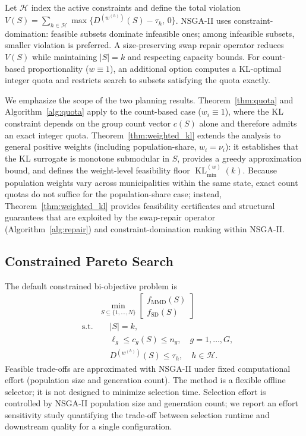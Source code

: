 \documentclass[10pt,journal]{IEEEtran}
\newcommand{\1}{\mathbf{1}}
\DeclareMathOperator{\KL}{KL}
\theoremstyle{ieeethm}
\begin{document}
Let $\mathcal{H}$ index the active constraints and define the total violation
$V(S)=\sum_{h\in\mathcal{H}} \max\{ D^{(w^{(h)})}(S) - \tau_h,\, 0\}$.
NSGA-II uses constraint-domination: feasible subsets dominate infeasible ones; among infeasible subsets, smaller violation is preferred.
A size-preserving swap repair operator reduces $V(S)$ while maintaining $|S|=k$ and respecting capacity bounds.
For count-based proportionality ($w\equiv 1$), an additional option computes a KL-optimal integer quota and restricts search to subsets satisfying the quota exactly.

We emphasize the scope of the two planning results. Theorem~\ref{thm:quota} and
Algorithm~\ref{alg:quota} apply to the count-based case ($w_i\equiv 1$), where the
KL constraint depends on the group count vector $c(S)$ alone and therefore admits an exact
integer quota. Theorem~\ref{thm:weighted_kl} extends the analysis to general positive weights
(including population-share, $w_i=\nu_i$): it establishes that the KL surrogate is monotone
submodular in $S$, provides a greedy approximation bound, and defines the weight-level
feasibility floor $\KL^{(w)}_{\min}(k)$. Because population weights vary across municipalities
within the same state, exact count quotas do not suffice for the population-share case; instead,
Theorem~\ref{thm:weighted_kl} provides feasibility certificates and structural guarantees that
are exploited by the swap-repair operator (Algorithm~\ref{alg:repair}) and constraint-domination
ranking within NSGA-II.

\subsection{Constrained Pareto Search}

The default constrained bi-objective problem is
\begin{equation*}
\begin{aligned}
&\qquad \min_{S\subseteq\{1,\dots,N\}}
\begin{bmatrix}
f_{\mathrm{MMD}}(S)\\
f_{\mathrm{SD}}(S)
\end{bmatrix}\\[1ex]
&\text{s.t.} \qquad |S|=k,\\
&\mspace{60mu} \ell_g \le c_g(S) \le n_g,
\quad
g=1,\dots,G,\\
&\mspace{60mu} D^{(w^{(h)})}(S)\le \tau_h,
\quad
h\in\mathcal{H}.
\end{aligned}
\end{equation*}
Feasible trade-offs are approximated with NSGA-II under fixed computational effort (population size and generation count).
The method is a flexible offline selector; it is not designed to minimize selection time.
Selection effort is controlled by NSGA-II population size and generation count; we report an effort sensitivity study quantifying the trade-off between selection runtime and downstream quality for a single configuration.
\end{document}
